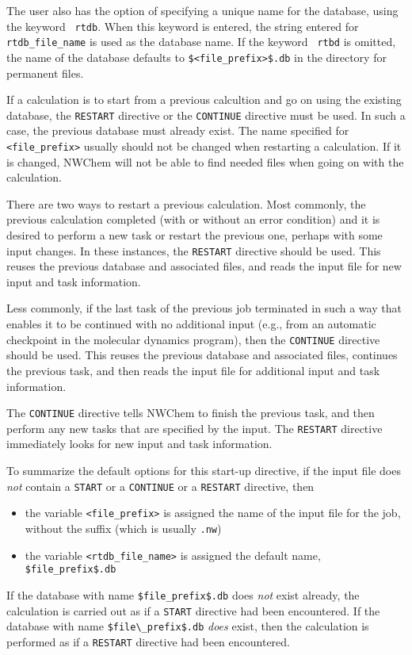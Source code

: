 The user also has the option of
specifying a unique name for the database, using the keyword {\tt
  rtdb}.  When this keyword is entered, the string entered for {\tt
  rtdb\_file\_name} is used as the database name.  If the keyword {\tt
  rtbd} is omitted, the name of the database defaults to
\verb+$<file_prefix>$.db+ in the directory for permanent files.

If a calculation is to start from a previous calcultion and go on
using the existing database, the \verb+RESTART+ directive or the
\verb+CONTINUE+ directive must be used.  In such a case, the previous
database must already exist.  The name specified for {\tt <file\_prefix>} 
usually should
not be changed when restarting a calculation.  If it is changed, NWChem 
will not
be able to find needed files when going on with the
calculation.

There are two ways to restart a previous calculation.  Most commonly,
the previous calculation completed (with or without an error
condition) and it is desired to perform a new task or restart the
previous one, perhaps with some input changes.  In these instances,
the \verb+RESTART+ directive should be used.  This reuses the previous
database and associated files, and reads the input file for new input
and task information.

Less commonly, if the last task of the previous job terminated in such
a way that enables it to be continued with no additional
input (e.g., from an automatic
checkpoint in the molecular dynamics program), then the 
\verb+CONTINUE+ directive should be used.  This reuses
the previous database and associated files, continues the previous
task, and then reads the input file for additional input and task
information.

The \verb+CONTINUE+ directive tells NWChem to finish the
previous task, and then perform any new tasks that are specified by
the input. The \verb+RESTART+ directive immediately looks for new
input and task information.

To summarize the default options for this start-up directive, if the 
input file does {\em not} contain a \verb+START+ or a \verb+CONTINUE+ or a
\verb+RESTART+ directive, then
\begin{itemize}
  \item the variable {\tt <file\_prefix>} is assigned the name of the 
input file for the job, without the suffix (which is usually \verb+.nw+)
  \item the variable {\tt <rtdb\_file\_name>} is assigned the default name,
\verb+$file_prefix$.db+
\end{itemize}
If the database with name \verb+$file_prefix$.db+ does {\it not} 
exist already,
the calculation is carried out as if a \verb+START+ directive had
been encountered.  If the database with name \verb+$file\_prefix$.db+
{\it does} exist, then the calculation is performed as if a
\verb+RESTART+ directive had been encountered.  

